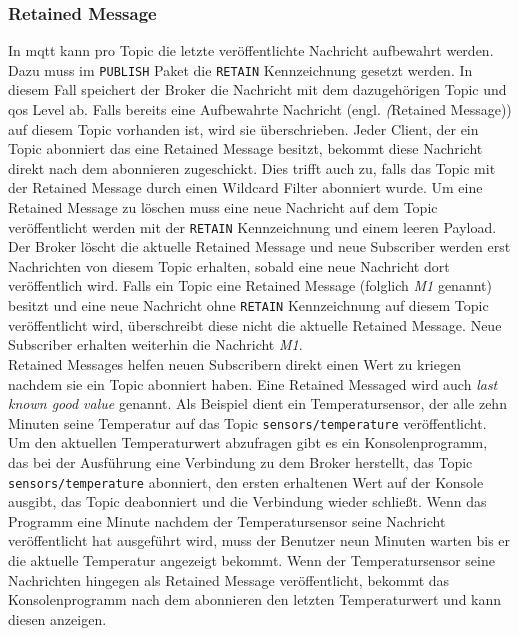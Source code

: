 \subsubsection{Retained Message} \label{s:retained-messages}
In \ac{mqtt} kann pro Topic die letzte veröffentlichte Nachricht aufbewahrt werden.
Dazu muss im \verb|PUBLISH| Paket die \verb|RETAIN| Kennzeichnung gesetzt werden.
In diesem Fall speichert der Broker die Nachricht mit dem dazugehörigen Topic und \ac{qos} Level ab.
Falls bereits eine Aufbewahrte Nachricht (engl. \textit(Retained Message)) auf diesem Topic vorhanden ist, wird sie überschrieben.
Jeder Client, der ein Topic abonniert das eine Retained Message besitzt, bekommt diese Nachricht direkt nach dem abonnieren zugeschickt.
Dies trifft auch zu, falls das Topic mit der Retained Message durch einen Wildcard Filter abonniert wurde.
\cite{teamRetainedMessagesMQTT}
Um eine Retained Message zu löschen muss eine neue Nachricht auf dem Topic veröffentlicht werden mit der \verb|RETAIN| Kennzeichnung und einem leeren Payload. Der Broker löscht die aktuelle Retained Message und neue Subscriber werden erst Nachrichten von diesem Topic erhalten, sobald eine neue Nachricht dort veröffentlich wird.
Falls ein Topic eine Retained Message (folglich \textit{M1} genannt) besitzt und eine neue Nachricht ohne \verb|RETAIN| Kennzeichnung auf diesem Topic veröffentlicht wird, überschreibt diese nicht die aktuelle Retained Message. Neue Subscriber erhalten weiterhin die Nachricht \textit{M1}.
\cite{mqtt5Specification}
\\
Retained Messages helfen neuen Subscribern direkt einen Wert zu kriegen nachdem sie ein Topic abonniert haben. Eine Retained Messaged wird auch \textit{last known good value} genannt.
\cite{teamRetainedMessagesMQTT}
Als Beispiel dient ein Temperatursensor, der alle zehn Minuten seine Temperatur auf das Topic \verb|sensors/temperature| veröffentlicht. Um den aktuellen Temperaturwert abzufragen gibt es ein Konsolenprogramm, das bei der Ausführung eine Verbindung zu dem Broker herstellt, das Topic \verb|sensors/temperature| abonniert, den ersten erhaltenen Wert auf der Konsole ausgibt, das Topic deabonniert und die Verbindung wieder schlie{\ss}t. Wenn das Programm eine Minute nachdem der Temperatursensor seine Nachricht veröffentlicht hat ausgeführt wird, muss der Benutzer neun Minuten warten bis er die aktuelle Temperatur angezeigt bekommt. Wenn der Temperatursensor seine Nachrichten hingegen als Retained Message veröffentlicht, bekommt das Konsolenprogramm nach dem abonnieren den letzten Temperaturwert und kann diesen anzeigen.

